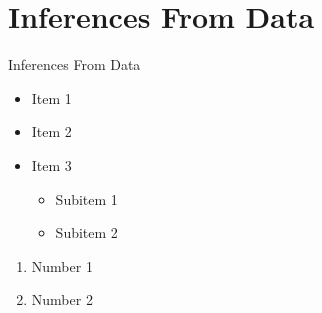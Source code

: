 \documentclass{beamer}
\begin{document}
\section{Inferences From Data }
\begin{frame}{Inferences From Data}
    \begin{itemize}
        \item Item 1
        \item Item 2
        \item Item 3
        \begin{itemize}
            \item Subitem 1
            \item Subitem 2
        \end{itemize}
    \end{itemize}

    \begin{enumerate}
        \item Number 1
        \item Number 2
    \end{enumerate}
\end{frame}
\end{document}
